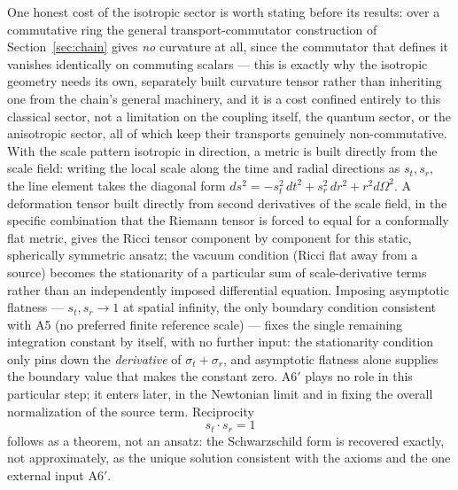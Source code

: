 \documentclass[aps,prd,twocolumn,superscriptaddress,nofootinbib]{revtex4-2}
\begin{document}
One honest cost of the isotropic sector is worth stating before its
results: over a commutative ring the general transport-commutator
construction of Section~\ref{sec:chain} gives \emph{no} curvature at
all, since the commutator that defines it vanishes identically on
commuting scalars — this is exactly why the isotropic geometry needs its
own, separately built curvature tensor rather than inheriting one from
the chain's general machinery, and it is a cost confined entirely to
this classical sector, not a limitation on the coupling itself, the
quantum sector, or the anisotropic sector, all of which keep their
transports genuinely non-commutative. With the scale pattern isotropic
in direction, a metric is built directly
from the scale field: writing the local scale along the time and radial
directions as $s_t, s_r$, the line element takes the diagonal form
$ds^2 = -s_t^2\,dt^2 + s_r^2\,dr^2 + r^2 d\Omega^2$. A deformation
tensor built directly from second derivatives of the scale field, in the
specific combination that the Riemann tensor is forced to equal for a
conformally flat metric, gives the Ricci tensor component by component
for this static, spherically symmetric ansatz; the
vacuum condition (Ricci flat away from a source) becomes the
stationarity of a particular sum of scale-derivative terms rather than
an independently imposed differential equation. Imposing asymptotic
flatness — $s_t, s_r \to 1$ at spatial infinity, the only boundary
condition consistent with A5 (no preferred finite reference scale) —
fixes the single remaining integration constant by itself, with no
further input: the stationarity condition only pins down the
\emph{derivative} of $\sigma_t+\sigma_r$, and asymptotic flatness alone
supplies the boundary value that makes the constant zero. A6$'$ plays no
role in this particular step; it enters later, in the Newtonian limit
and in fixing the overall normalization of the source term. Reciprocity
\begin{equation}
s_t \cdot s_r = 1
\end{equation}
follows as a theorem, not an ansatz: the Schwarzschild form is recovered
exactly, not approximately, as the unique solution consistent with the
axioms and the one external input A6$'$.
\end{document}
